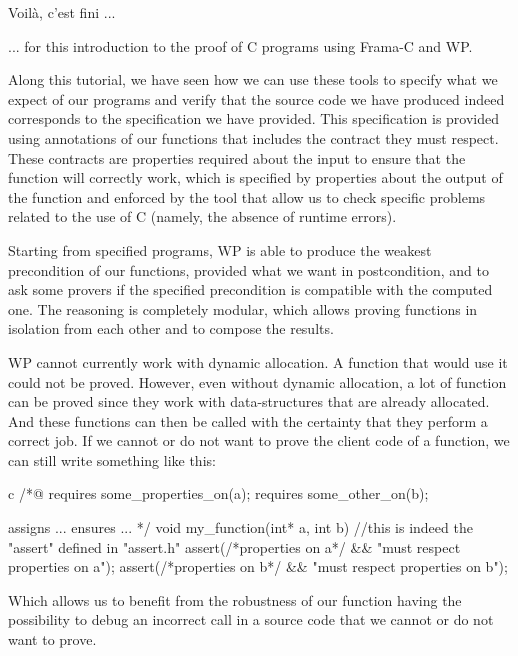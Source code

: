 \begin{Quotation}
Voilà, c'est fini ...
\end{Quotation}
... for this introduction to the proof of C programs using Frama-C
and WP.

Along this tutorial, we have seen how we can use these tools to specify
what we expect of our programs and verify that the source code we have
produced indeed corresponds to the specification we have provided. This
specification is provided using annotations of our functions that
includes the contract they must respect. These contracts are properties
required about the input to ensure that the function will correctly
work, which is specified by properties about the output of the function
and enforced by the tool that allow us to check specific problems related
to the use of C (namely, the absence of runtime errors).

Starting from specified programs, WP is able to produce the weakest
precondition of our functions, provided what we want in postcondition,
and to ask some provers if the specified precondition is compatible with
the computed one. The reasoning is completely modular, which allows
proving functions in isolation from each other and to compose the results.


WP cannot currently work with dynamic allocation. A function that would use it
could not be proved. However, even without dynamic allocation, a lot of function
can be proved since they work with data-structures that are already allocated.
And these functions can then be called with the certainty that they
perform a correct job. If we cannot or do not want to prove the client code of a
function, we can still write something like this:



\begin{CodeBlock}{c}
/*@
  requires some_properties_on(a);
  requires some_other_on(b);

  assigns ...
  ensures ...
*/
void my_function(int* a, int b){
  //this is indeed the  "assert" defined in "assert.h"
  assert(/*properties on a*/ && "must respect properties on a");
  assert(/*properties on b*/ && "must respect properties on b");
}
\end{CodeBlock}



Which allows us to benefit from the robustness of our function having
the possibility to debug an incorrect call in a source code that we
cannot or do not want to prove.

